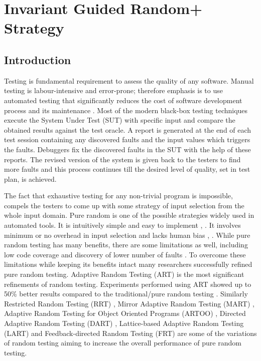 \chapter{Invariant Guided Random+ Strategy}
\label{chap:IGRS}

\section{Introduction}\label{sec:intro5}

Testing is fundamental requirement to assess the quality of any software. Manual testing is labour-intensive and error-prone; therefore emphasis is to use automated testing that significantly reduces the cost of software development process and its maintenance \cite{beizer1995black}. Most of the modern black-box testing techniques execute the System Under Test (SUT) with specific input and compare the obtained results against the test oracle. A report is generated at the end of each test session containing any discovered faults and the input values which triggers the faults. Debuggers fix the discovered faults in the SUT with the help of these reports. The revised version of the system is given back to the testers to find more faults and this process continues till the desired level of quality, set in test plan, is achieved.

The fact that exhaustive testing for any non-trivial program is impossible, compels the testers to come up with some strategy of input selection from the whole input domain. Pure random is one of the possible strategies widely used in automated tools. It is intuitively simple and easy to implement \cite{Ciupa2008},  \cite{Forrester2000}. It involves minimum or no overhead in input selection and lacks human bias \cite{hamlet1994},  \cite{Linger1993}. While pure random testing has many benefits, there are some limitations as well, including low code coverage \cite{Offutt1996} and discovery of lower number of faults \cite{Chen1994}. To overcome these limitations while keeping its benefits intact many researchers successfully refined pure random testing. Adaptive Random Testing (ART) is the most significant refinements of random testing. Experiments performed using ART showed up to 50\% better results compared to the traditional/pure random testing  \cite{Chen2008}.  Similarly Restricted Random Testing (RRT) \cite{Chan2002}, Mirror Adaptive Random Testing (MART)  \cite{Chen2004}, Adaptive Random Testing for Object Oriented Programs (ARTOO) \cite{Ciupa2008}, Directed Adaptive Random Testing (DART)  \cite{Godefroid2005}, Lattice-based Adaptive Random Testing (LART) \cite{Mayer2005} and Feedback-directed Random Testing (FRT) \cite{Pacheco2007} are some of the variations of random testing aiming to increase the overall performance of pure random testing.

